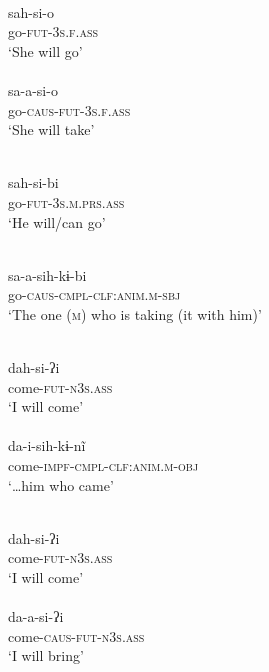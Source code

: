 \documentclass[output=paper]{langscibook}
\begin{document}
\newpage
\begin{exe}
\columnsep=-50pt
\ex\label{exe-preS-h-vv}
\begin{xlist}
\ex
\begin{multicols}{2}
\ea
{}\\
sah-si-o\\
go-\textsc{fut-3s.f.ass}\\
\trans `She will go'\\
{\citep[100]{Bruil:2014}}
\ex
{}\\
sa-a-si-o\\
go-\textsc{caus-fut-3s.f.ass}\\
\trans `She will take'\\
{\citep[100]{Bruil:2014}}
\z
\end{multicols}
\ex
\begin{multicols}{2}
\ea \glll [sah.si.βi]\\
sah-si-bi\\
go-\textsc{fut-3s.m.prs.ass}\\
\trans `He will/can go'\\
{\citep[197]{Bruil:2014}}

\ex {}\\
sa-a-sih-kɨ-bi\\
go-\textsc{caus-cmpl-clf:anim.m-sbj}\\
\trans `The one (\textsc{m}) who is taking (it with him)'\\
{\citep[20120918elicr004]{Bruil:2012}}
\z
\end{multicols}
\ex
\begin{multicols}{2}
\ea \glll [t̰ah.si.ʔi]\\
dah-si-ʔi\\
come-\textsc{fut-n3s.ass}\\
\trans `I will come'\\
{\citep[100]{Bruil:2014}}
\ex
\glll [t̰ai.sih.kɨ.nĩ]\\
da-i-sih-kɨ-nĩ\\
come-\textsc{impf-cmpl-clf:anim.m-obj}\\
\trans `\ldots him who came'\\
{\citep[345]{Bruil:2014}}
\z
\end{multicols}

\ex
\begin{multicols}{2}
\ea
\glll [t̰ah.si.ʔi]\\
      dah-si-ʔi\\
      come-\textsc{fut-n3s.ass}\\
      \trans `I will come'\\
{\citep[100]{Bruil:2014}}
\ex
\glll [t̰aː.si.ʔi]\\
	  da-a-si-ʔi\\
	  come-\textsc{caus-fut-n3s.ass}\\
\trans `I will bring'\\
{\citep[100]{Bruil:2014}}
\z
\end{multicols}
\end{xlist}
\end{exe}
\end{document}
